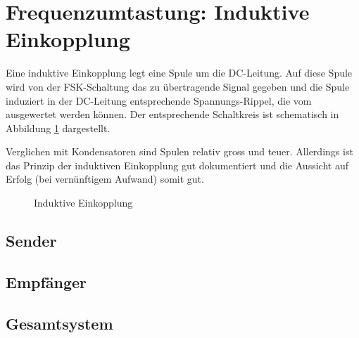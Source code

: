 \section{Frequenzumtastung: Induktive Einkopplung}
\label{sec:simu:fsk:inductive}

Eine induktive Einkopplung legt eine  Spule um die DC-Leitung. Auf diese Spule
wird von der FSK-Schaltung das zu  \"ubertragende Signal gegeben und die Spule
induziert in  der DC-Leitung  entsprechende Spannungs-Rippel, die  vom \Master
ausgewertet werden k\"onnen. Der entsprechende  Schaltkreis ist schematisch in
Abbildung \ref{fig:circ:coupling:inductive} dargestellt.

Verglichen mit  Kondensatoren sind Spulen relativ  gross und teuer. Allerdings
ist das Prinzip  der induktiven Einkopplung gut dokumentiert  und die Aussicht
auf Erfolg (bei vern\"unftigem Aufwand) somit gut.

\begin{figure}[h!tb]
    \centering
    
    \caption{Induktive Einkopplung}
    \label{fig:circ:coupling:inductive}
\end{figure}

\subsection{Sender}
\label{sec:simu:fsk:inductive:transmitter}

\subsection{Empf\"anger}
\label{sec:simu:fsk:inductive:receiver}

\subsection{Gesamtsystem}
\label{sec:simu:fsk:inductive:inductive}


